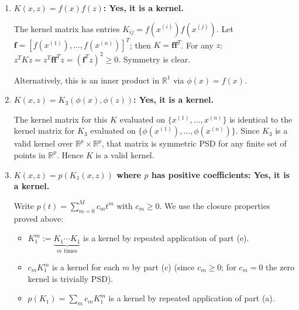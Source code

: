 \begin{answer}
\begin{enumerate}
\item \textbf{$K(x,z) = f(x)f(z)$: Yes, it is a kernel.}

The kernel matrix has entries $K_{ij} = f(x^{(i)})f(x^{(j)})$. Let $\mathbf{f} = [f(x^{(1)}),\ldots,f(x^{(n)})]^T$; then $K = \mathbf{f}\mathbf{f}^T$. For any $z$: $z^T K z = z^T \mathbf{f}\mathbf{f}^T z = (\mathbf{f}^T z)^2 \geq 0$. Symmetry is clear.

Alternatively, this is an inner product in $\mathbb{R}^1$ via $\phi(x) = f(x)$.

\item \textbf{$K(x,z) = K_3(\phi(x), \phi(z))$: Yes, it is a kernel.}

The kernel matrix for this $K$ evaluated on $\{x^{(1)},\ldots,x^{(n)}\}$ is identical to the kernel matrix for $K_3$ evaluated on $\{\phi(x^{(1)}),\ldots,\phi(x^{(n)})\}$. Since $K_3$ is a valid kernel over $\mathbb{R}^p\times\mathbb{R}^p$, that matrix is symmetric PSD for any finite set of points in $\mathbb{R}^p$. Hence $K$ is a valid kernel.

\item \textbf{$K(x,z) = p(K_1(x,z))$ where $p$ has positive coefficients: Yes, it is a kernel.}

Write $p(t) = \sum_{m=0}^{M} c_m t^m$ with $c_m \geq 0$. We use the closure properties proved above:
\begin{itemize}
  \item $K_1^m := \underbrace{K_1 \cdots K_1}_{m \text{ times}}$ is a kernel by repeated application of part (e).
  \item $c_m K_1^m$ is a kernel for each $m$ by part (c) (since $c_m \geq 0$; for $c_m = 0$ the zero kernel is trivially PSD).
  \item $p(K_1) = \sum_m c_m K_1^m$ is a kernel by repeated application of part (a).
\end{itemize}

\end{enumerate}

\end{answer}
